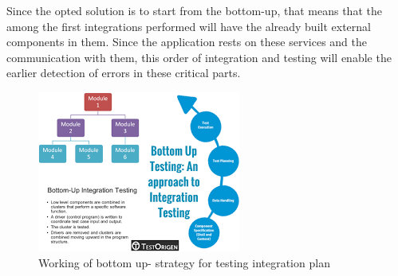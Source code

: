 Since the opted solution is to start from the bottom-up, that means that the among the first integrations performed will have the already built external components in them. Since the application rests on these services and the communication with them, this order of integration and testing will enable the earlier detection of errors in these critical parts. 
\begin{figure}[H]
	\begin{center}
		\includegraphics[width=\textwidth]{./DD_Diagrams/testplan.png}
      \caption{Working of bottom up- strategy for testing integration plan}
        \label{TrackMe_tp}
	\end{center}
\end{figure}